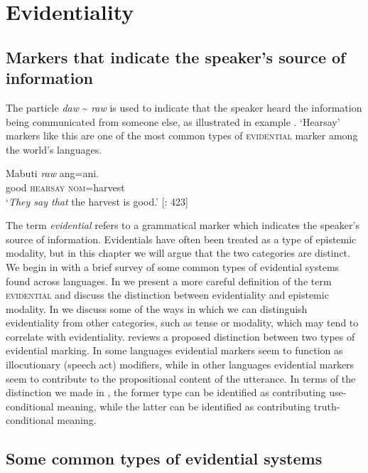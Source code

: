 \chapter{Evidentiality}\label{sec:17}

\section{Markers that indicate the speaker’s source of information}\label{sec:17.1}
The  particle \textit{daw} {\textasciitilde} \textit{raw} is used to indicate that the speaker heard the information being communicated from someone else, as illustrated in example . ‘Hearsay’ markers like this are one of the most common types of \textsc{evidential} marker among the world’s languages.


\ea \label{ex:17.1}
\gll Mabuti  \textit{raw}  ang=ani.\\
good  \textsc{hearsay}  \textsc{nom}=harvest\\
\glt ‘\textit{They say that} the harvest is good.’   [\citealt{SchachterOtanes1972}: 423]
\z


The term \textit{evidential} refers to a grammatical marker which indicates the speak\-er’s source of information. Evidentials have often been treated as a type of epistemic modality, but in this chapter we will argue that the two categories are distinct. We begin in  with a brief survey of some common types of evidential systems found across languages. In  we present a more careful definition of the term \textsc{evidential} and discuss the distinction between evidentiality and epistemic modality. In  we discuss some of the ways in which we can distinguish evidentiality from other categories, such as tense or modality, which may tend to correlate with evidentiality.  reviews a proposed distinction between two types of evidential marking. In some languages evidential markers seem to function as illocutionary (speech act) modifiers, while in other languages evidential markers seem to contribute to the propositional content of the utterance. In terms of the distinction we made in , the former type can be identified as contributing use-conditional meaning, while the latter can be identified as contributing truth-conditional meaning.


\section{Some common types of evidential systems}\label{sec:17.2}

